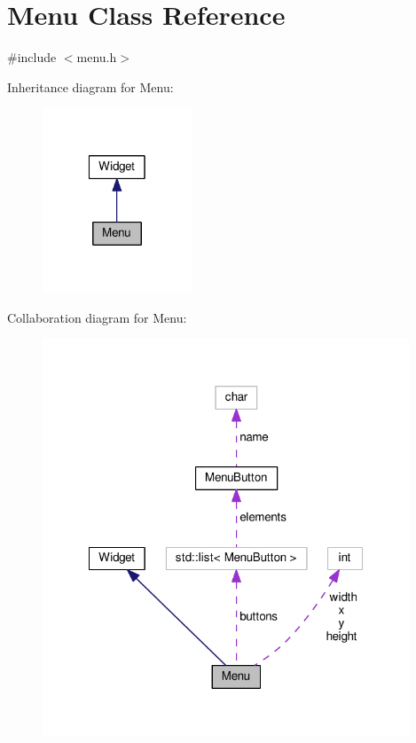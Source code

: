 \hypertarget{class_menu}{\section{Menu Class Reference}
\label{class_menu}
}


{\ttfamily \#include $<$menu.\-h$>$}



Inheritance diagram for Menu\-:
\nopagebreak
\begin{figure}[H]
\begin{center}
\leavevmode
\includegraphics[width=126pt]{class_menu__inherit__graph}
\end{center}
\end{figure}


Collaboration diagram for Menu\-:
\nopagebreak
\begin{figure}[H]
\begin{center}
\leavevmode
\includegraphics[width=310pt]{class_menu__coll__graph}
\end{center}
\end{figure}
